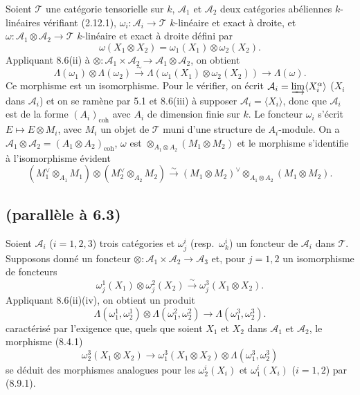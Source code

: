 \documentclass[12pt,a4paper]{article}
\theoremstyle{plain}
\theoremstyle{definition}
\newcommand{\coh}{\mathrm{coh}}
\begin{document}
Soient $\mathcal{T}$ une catégorie tensorielle sur $k$, $\mathcal{A}_1$ et $\mathcal{A}_2$ deux catégories abéliennes $k$-linéaires vérifiant (2.12.1), $\omega_i : \mathcal{A}_i \to \mathcal{T}$ $k$-linéaire et exact à droite, et $\omega : \mathcal{A}_1 \otimes \mathcal{A}_2 \to \mathcal{T}$ $k$-linéaire et exact à droite défini par
\[
\omega(X_1 \otimes X_2) = \omega_1(X_1) \otimes \omega_2(X_2).
\]
Appliquant 8.6(ii) à $\otimes : \mathcal{A}_1 \times \mathcal{A}_2 \to \mathcal{A}_1 \otimes \mathcal{A}_2$, on obtient
\begin{equation}\label{eq:8.8.1}
\Lambda(\omega_1) \otimes \Lambda(\omega_2) \xrightarrow{\sim} \Lambda(\omega_1(X_1) \otimes \omega_2(X_2)) \to \Lambda(\omega).
\end{equation}
Ce morphisme est un isomorphisme. Pour le vérifier, on écrit $\mathcal{A}_i = \varinjlim \langle X_i^\alpha \rangle$ ($X_i$ dans $\mathcal{A}_i$) et on se ramène par 5.1 et 8.6(iii) à supposer $\mathcal{A}_i = \langle X_i \rangle$, donc que $\mathcal{A}_i$ est de la forme $(A_i)_{\coh}$ avec $A_i$ de dimension finie sur $k$. Le foncteur $\omega_i$ s'écrit $E \mapsto E \otimes M_i$, avec $M_i$ un objet de $\mathcal{T}$ muni d'une structure de $A_i$-module. On a $\mathcal{A}_1 \otimes \mathcal{A}_2 = (A_1 \otimes A_2)_{\coh}$, $\omega$ est $\otimes_{A_1 \otimes A_2}(M_1 \otimes M_2)$ et le morphisme s'identifie à l'isomorphisme évident
\[
(M_1^\vee \otimes_{A_1} M_1) \otimes (M_2^\vee \otimes_{A_2} M_2) \xrightarrow{\sim} (M_1 \otimes M_2)^\vee \otimes_{A_1 \otimes A_2} (M_1 \otimes M_2).
\]

\subsection{(parallèle à 6.3)}

Soient $\mathcal{A}_i$ ($i = 1, 2, 3$) trois catégories et $\omega_j^i$ (resp.~$\omega_k^i$) un foncteur de $\mathcal{A}_i$ dans $\mathcal{T}$. Supposons donné un foncteur $\otimes : \mathcal{A}_1 \times \mathcal{A}_2 \to \mathcal{A}_3$ et, pour $j = 1, 2$ un isomorphisme de foncteurs
\[
\omega_j^1(X_1) \otimes \omega_j^2(X_2) \xrightarrow{\sim} \omega_j^3(X_1 \otimes X_2).
\]
Appliquant 8.6(ii)(iv), on obtient un produit
\begin{equation}\label{eq:8.9.1}
\Lambda(\omega_1^1, \omega_2^1) \otimes \Lambda(\omega_1^2, \omega_2^2) \to \Lambda(\omega_1^3, \omega_2^3).
\end{equation}
caractérisé par l'exigence que, quels que soient $X_1$ et $X_2$ dans $\mathcal{A}_1$ et $\mathcal{A}_2$, le morphisme (8.4.1)
\[
\omega_2^3(X_1 \otimes X_2) \to \omega_1^3(X_1 \otimes X_2) \otimes \Lambda(\omega_1^3, \omega_2^3)
\]
se déduit des morphismes analogues pour les $\omega_2^i(X_i)$ et $\omega_1^i(X_i)$ ($i = 1, 2$) par (8.9.1).
\end{document}
